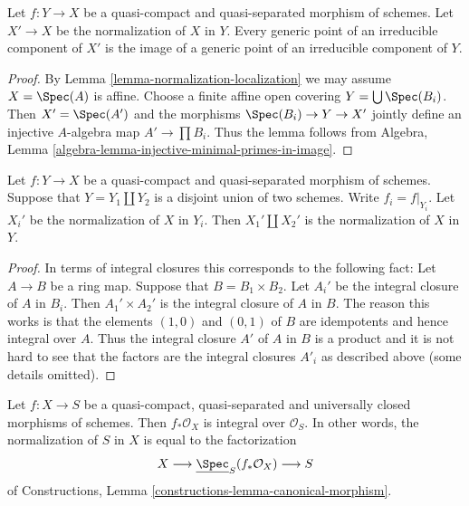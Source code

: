 \begin{lemma}
\label{lemma-normalization-generic}
Let $f : Y \to X$ be a quasi-compact and quasi-separated morphism of schemes.
Let $X' \to X$ be the normalization of $X$ in $Y$. Every generic point of
an irreducible component of $X'$ is the image of a generic point of
an irreducible component of $Y$.
\end{lemma}

\begin{proof}
By Lemma \ref{lemma-normalization-localization} we may assume $X = \Spec(A)$
is affine. Choose a finite affine open covering $Y = \bigcup \Spec(B_i)$.
Then $X' = \Spec(A')$ and the morphisms $\Spec(B_i) \to Y \to X'$
jointly define an injective $A$-algebra map $A' \to \prod B_i$.
Thus the lemma follows from
Algebra, Lemma \ref{algebra-lemma-injective-minimal-primes-in-image}.
\end{proof}

\begin{lemma}
\label{lemma-normalization-in-disjoint-union}
Let $f : Y \to X$ be a quasi-compact and quasi-separated morphism of schemes.
Suppose that $Y = Y_1 \amalg Y_2$ is a disjoint union of two schemes.
Write $f_i = f|_{Y_i}$. Let $X_i'$ be the normalization of $X$ in $Y_i$.
Then $X_1' \amalg X_2'$ is the normalization of $X$ in $Y$.
\end{lemma}

\begin{proof}
In terms of integral closures this corresponds to the following fact:
Let $A \to B$ be a ring map. Suppose that $B = B_1 \times B_2$.
Let $A_i'$ be the integral closure of $A$ in $B_i$. Then
$A_1' \times A_2'$ is the integral closure of $A$ in $B$.
The reason this works is that the elements $(1, 0)$ and $(0, 1)$ of $B$
are idempotents and hence integral over $A$. Thus the integral closure
$A'$ of $A$ in $B$ is a product and it is not hard to see that the factors
are the integral closures $A'_i$ as described above (some details
omitted).
\end{proof}

\begin{lemma}
\label{lemma-normalization-in-universally-closed}
Let $f : X \to S$ be a quasi-compact, quasi-separated and
universally closed morphisms of schemes.
Then $f_*\mathcal{O}_X$ is integral over $\mathcal{O}_S$. In other
words, the normalization of $S$ in $X$ is equal to the factorization
$$
X \longrightarrow \underline{\Spec}_S(f_*\mathcal{O}_X)
\longrightarrow S
$$
of Constructions, Lemma \ref{constructions-lemma-canonical-morphism}.
\end{lemma}

